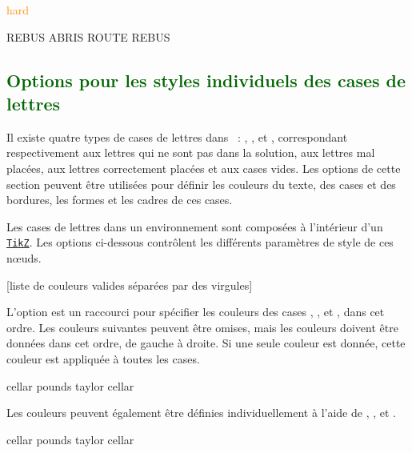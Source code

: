 \documentclass[svgnames]{report}
\newcommand\ctan[1]{\href{https://www.ctan.org/pkg/#1}{\texttt{#1}}}
\newcommand\Section[1]{\subsection{\textcolor{DarkGreen}{#1}}}
\begin{document}
  \textcolor{DarkOrange}{hard}

  \begin{example}
  \begin{GrilleSutom}[Style=hard]{REBUS}
    ABRIS
    ROUTE
    REBUS
  \end{GrilleSutom}
  \end{example}

  \Section{Options pour les styles individuels des cases de lettres}

  Il existe quatre types de cases de lettres dans  :
  , ,  et
  , correspondant respectivement aux lettres qui ne sont pas dans la solution,
  aux lettres mal placées, aux lettres correctement placées et aux cases vides. Les options de cette section peuvent être utilisées pour
  définir les couleurs du texte, des cases et des bordures, les formes et les cadres de ces cases.

  Les cases de lettres dans un environnement  sont composées à l'intérieur
  d'un \keyword{\node} \ctan{TikZ}. Les options ci-dessous contrôlent les
  différents paramètres de style de ces nœuds.

  [liste de couleurs valides séparées par des virgules]

  L'option  est un raccourci pour spécifier les
  couleurs des cases , ,  et
  , dans cet ordre. Les couleurs suivantes peuvent être omises, mais
  les couleurs doivent être données dans cet ordre, de gauche à droite.
  Si une seule couleur est donnée, cette couleur est appliquée à toutes les cases.

  \begin{example}
  \begin{GrilleSutom}[Couleurs={LightGray,Orange,Teal}]{cellar}
    pounds
    taylor
    cellar
  \end{GrilleSutom}
  \end{example}

  Les couleurs peuvent également être définies individuellement à l'aide de , ,  et .

  \begin{example}
  \begin{GrilleSutom}[couleur absent=DarkGray,couleur present=Salmon,
                 couleur correct=SeaGreen]{cellar}
    pounds
    taylor
    cellar
  \end{GrilleSutom}
  \end{example}
\end{document}
